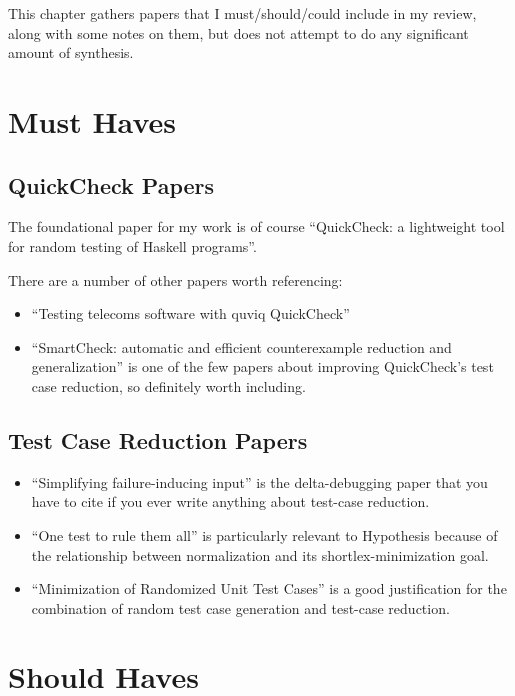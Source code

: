 This chapter gathers papers that I must/should/could include in my review,
along with some notes on them,
but does not attempt to do any significant amount of synthesis.

\section{Must Haves}

\subsection{QuickCheck Papers}

The foundational paper for my work is of course ``QuickCheck: a lightweight tool for random testing of Haskell programs''\cite{DBLP:conf/icfp/ClaessenH00}.

There are a number of other papers worth referencing:

\begin{itemize}
\item ``Testing telecoms software with quviq QuickCheck''\cite{DBLP:conf/erlang/ArtsHJW06}
\item ``SmartCheck: automatic and efficient counterexample reduction and generalization''\cite{DBLP:conf/haskell/Pike14} is one of the few papers about improving QuickCheck's test case reduction,
so definitely worth including.
\end{itemize}

\subsection{Test Case Reduction Papers}

\begin{itemize}
\item ``Simplifying failure-inducing input''\cite{DBLP:conf/issta/HildebrandtZ00} is the delta-debugging paper that you have to cite if you ever write anything about test-case reduction.
\item ``One test to rule them all''\cite{DBLP:conf/issta/GroceHK17} is particularly relevant to Hypothesis because of the relationship between normalization and its shortlex-minimization goal.
\item ``Minimization of Randomized Unit Test Cases''\cite{DBLP:conf/issre/LeiA05} is a good justification for the combination of random test case generation and test-case reduction.
\end{itemize}


\section{Should Haves}

